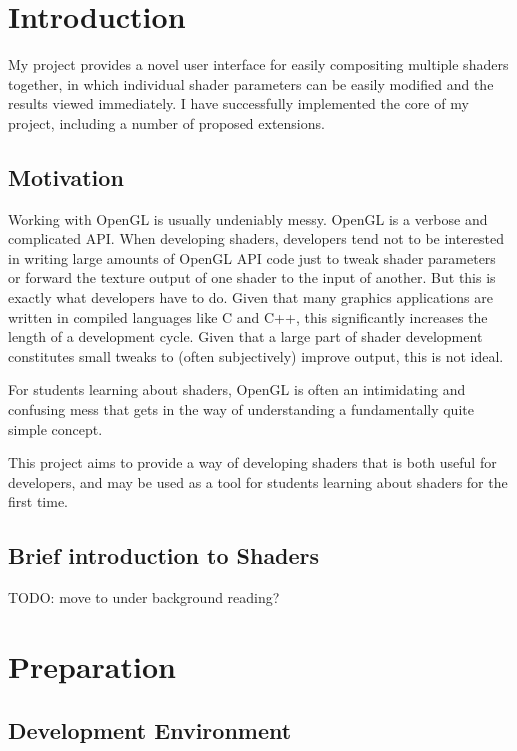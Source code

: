 \documentclass[12pt,twoside,notitlepage]{report}
\begin{document}
\setcounter{page}{1}
\pagestyle{headings}

\chapter{Introduction}
My project provides a novel user interface for easily compositing multiple shaders together, in which individual shader parameters can be easily modified and the results viewed immediately. I have successfully implemented the core of my project, including a number of proposed extensions.

\section{Motivation}
Working with OpenGL is usually undeniably messy. OpenGL is a verbose and complicated API. When developing shaders, developers tend not to be interested in writing large amounts of OpenGL API code just to tweak shader parameters or forward the texture output of one shader to the input of another. But this is exactly what developers have to do. Given that many graphics applications are written in compiled languages like C and C++, this significantly increases the length of a development cycle. Given that a large part of shader development constitutes small tweaks to (often subjectively) improve output, this is not ideal.

For students learning about shaders, OpenGL is often an intimidating and confusing mess that gets in the way of understanding a fundamentally quite simple concept.

This project aims to provide a way of developing shaders that is both useful for developers, and may be used as a tool for students learning about shaders for the first time.

\section{Brief introduction to Shaders}
TODO: move to under background reading?

\cleardoublepage
\chapter{Preparation}

\section{Development Environment}
\end{document}
